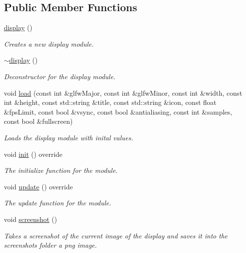 \subsection*{Public Member Functions}
\begin{DoxyCompactItemize}
\item 
\hyperlink{classflounder_1_1display_ac0a3910222a928f1fc60193cd65c0530}{display} ()
\begin{DoxyCompactList}\small\item\em Creates a new display module. \end{DoxyCompactList}\item 
\hyperlink{classflounder_1_1display_a272f9080af9079cbb3890b18c3e4d394}{$\sim$display} ()
\begin{DoxyCompactList}\small\item\em Deconstructor for the display module. \end{DoxyCompactList}\item 
void \hyperlink{classflounder_1_1display_ac1ad6ed9b98b6f760fecd2e31d84357b}{load} (const int \&glfw\+Major, const int \&glfw\+Minor, const int \&width, const int \&height, const std\+::string \&title, const std\+::string \&icon, const float \&fps\+Limit, const bool \&vsync, const bool \&antialiasing, const int \&samples, const bool \&fullscreen)
\begin{DoxyCompactList}\small\item\em Loads the display module with inital values. \end{DoxyCompactList}\item 
void \hyperlink{classflounder_1_1display_aa28a814bc8ba635c99aa4b707bac3259}{init} () override
\begin{DoxyCompactList}\small\item\em The initialize function for the module. \end{DoxyCompactList}\item 
void \hyperlink{classflounder_1_1display_a799c6a76fcac1a0ca56dfd6b8d7993fa}{update} () override
\begin{DoxyCompactList}\small\item\em The update function for the module. \end{DoxyCompactList}\item 
void \hyperlink{classflounder_1_1display_af27b3f93977c32c79ad9522672e484c5}{screenshot} ()
\begin{DoxyCompactList}\small\item\em Takes a screenshot of the current image of the display and saves it into the screenshots folder a png image. \end{DoxyCompactList}\item 

\end{DoxyCompactItemize}
